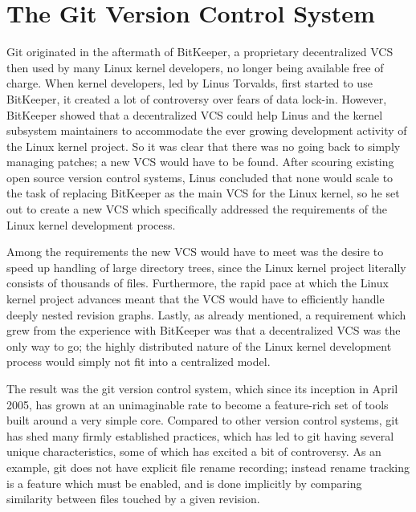\section{The Git Version Control System}
\label{sec:git}

Git originated in the aftermath of BitKeeper, a proprietary
decentralized VCS then used by many Linux kernel developers, no longer
being available free of charge. When kernel developers, led by Linus
Torvalds, first started to use BitKeeper, it created a lot of
controversy over fears of data lock-in. However, BitKeeper showed that
a decentralized VCS could help Linus and the kernel subsystem
maintainers to accommodate the ever growing development activity of
the Linux kernel project. So it was clear that there was no going back
to simply managing patches; a new VCS would have to be found. After
scouring existing open source version control systems, Linus concluded
that none would scale to the task of replacing BitKeeper as the main
VCS for the Linux kernel, so he set out to create a new VCS which
specifically addressed the requirements of the Linux kernel
development process.

Among the requirements the new VCS would have to meet was the desire
to speed up handling of large directory trees, since the Linux kernel
project literally consists of thousands of files. Furthermore, the
rapid pace at which the Linux kernel project advances meant that the
VCS would have to efficiently handle deeply nested revision graphs.
Lastly, as already mentioned, a requirement which grew from the
experience with BitKeeper was that a decentralized VCS was the only
way to go; the highly distributed nature of the Linux kernel
development process would simply not fit into a centralized model.


The result was the git version control system, which since its
inception in April 2005, has grown at an unimaginable rate to become a
feature-rich set of tools built around a very simple core. Compared to
other version control systems, git has shed many firmly established
practices, which has led to git having
several unique characteristics, some of which has excited a bit of
controversy. As an example, git does not have explicit file rename
recording; instead rename tracking is a feature which must be enabled,
and is done implicitly by comparing similarity between files touched
by a given revision.

